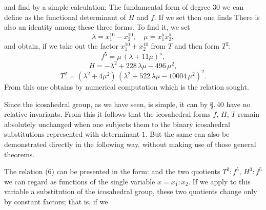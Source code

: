 and find by a simple calculation:
The fundamental form of degree 30 we can define as the functional determinant of $H$ and $f$. If we set
then one finds
There is also an identity among these three forms. To find it, we set
\[
\lambda = x_1^{10} - x_2^{10}, \quad \mu = x_1^5 x_2^5,
\]
and obtain, if we take out the factor $x_1^{10} + x_2^{10}$ from $T$ and then form $T^2$:
\[
f^5 = \mu\,(\lambda + 11\mu)^5,
\]
\[
H = -\lambda^2 + 228\,\lambda\mu - 496\,\mu^2,
\]
\[
T^2 = (\lambda^2 + 4\mu^2)\,(\lambda^2 + 522\,\lambda\mu - 10004\,\mu^2)^2.
\]
From this one obtains by numerical computation
which is the relation sought.

Since the icosahedral group, as we have seen, is simple, it can by \S.\,40 have no relative invariants. From this it follows that the icosahedral forms $f$, $H$, $T$ remain absolutely unchanged when one subjects them to the binary icosahedral substitutions represented with determinant $1$. But the same can also be demonstrated directly in the following way, without making use of those general theorems.

The relation (6) can be presented in the form:
and the two quotients $T^2 : f^5$, $H^3 : f^5$ we can regard as functions of the single variable $x = x_1 : x_2$. If we apply to this variable a substitution of the icosahedral group, these two quotients change only by constant factors; that is, if we
